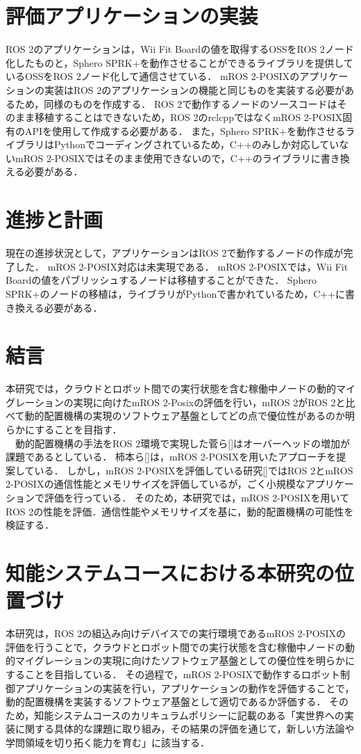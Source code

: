 \documentclass[11pt]{ujarticle}
\begin{document}
\section{評価アプリケーションの実装}
ROS 2のアプリケーションは，Wii Fit Boardの値を取得するOSSをROS 2ノード化したものと，Sphero SPRK+を動作させることができるライブラリを提供しているOSSをROS 2ノード化して通信させている．
mROS 2-POSIXのアプリケーションの実装はROS 2のアプリケーションの機能と同じものを実装する必要があるため，同様のものを作成する．
ROS 2で動作するノードのソースコードはそのまま移植することはできないため，ROS 2のrclcppではなくmROS 2-POSIX固有のAPIを使用して作成する必要がある．
また，Sphero SPRK+を動作させるライブラリはPythonでコーディングされているため，C++のみしか対応していないmROS 2-POSIXではそのまま使用できないので，C++のライブラリに書き換える必要がある．
\section{進捗と計画}
現在の進捗状況として，アプリケーションはROS 2で動作するノードの作成が完了した．
mROS 2-POSIX対応は未実現である．
mROS 2-POSIXでは，Wii Fit Boardの値をパブリッシュするノードは移植することができた．
Sphero SPRK+のノードの移植は，ライブラリがPythonで書かれているため，C++に書き換える必要がある．

\section{結言}
本研究では，クラウドとロボット間での実行状態を含む稼働中ノードの動的マイグレーションの実現に向けたmROS 2-Posixの評価を行い，mROS 2がROS 2と比べて動的配置機構の実現のソフトウェア基盤としてどの点で優位性があるのか明らかにすることを目指す．
\\　動的配置機構の手法をROS 2環境で実現した菅ら[]はオーバーヘッドの増加が課題であるとしている．
柿本ら[]は，mROS 2-POSIXを用いたアプローチを提案している．
しかし，mROS 2-POSIXを評価している研究[]ではROS 2とmROS 2-POSIXの通信性能とメモリサイズを評価しているが，ごく小規模なアプリケーションで評価を行っている．
そのため，本研究では，mROS 2-POSIXを用いてROS 2の性能を評価．通信性能やメモリサイズを基に，動的配置機構の可能性を検証する．
\section{知能システムコースにおける本研究の位置づけ}
本研究は，ROS 2の組込み向けデバイスでの実行環境であるmROS 2-POSIXの評価を行うことで，クラウドとロボット間での実行状態を含む稼働中ノードの動的マイグレーションの実現に向けたソフトウェア基盤としての優位性を明らかにすることを目指している．
その過程で，mROS 2-POSIXで動作するロボット制御アプリケーションの実装を行い，アプリケーションの動作を評価することで，動的配置機構を実装するソフトウェア基盤として適切であるか評価する．
そのため，知能システムコースのカリキュラムポリシーに記載のある「実世界への実装に関する具体的な課題に取り組み，その結果の評価を通じて，新しい方法論や学問領域を切り拓く能力を育む」に該当する．
\end{document}

